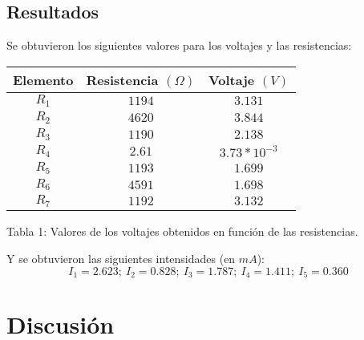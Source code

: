 \documentclass{article}
\begin{document}
\subsection{Resultados}
Se obtuvieron los siguientes valores para los voltajes y las resistencias:
\begin{center}
\begin{tabular}{||c|c|c||}
\hline
Elemento & Resistencia $(\Omega)$ & Voltaje $(V)$ \\ \hline
$R_1$ & $1194$ & $3.131$ \\ \hline
$R_2$ & $4620$ & $3.844$ \\ \hline
$R_3$ & $1190$ & $2.138$ \\ \hline
$R_4$ & $2.61$ & $3.73*10^{-3}$ \\ \hline
$R_5$ & $1193$ & $1.699$ \\ \hline
$R_6$ & $4591$ & $1.698$ \\ \hline
$R_7$ & $1192$ & $3.132$ \\ \hline
\end{tabular}
\end{center}
\begin{center}
Tabla 1: Valores de los voltajes obtenidos en funci\'on de las resistencias.
\end{center}
Y se obtuvieron las siguientes intensidades (en $mA$):
$$I_1=2.623;\ I_2=0.828;\ I_3=1.787;\ I_4=1.411;\ I_5=0.360$$
\section{Discusi\'on}
\end{document}
